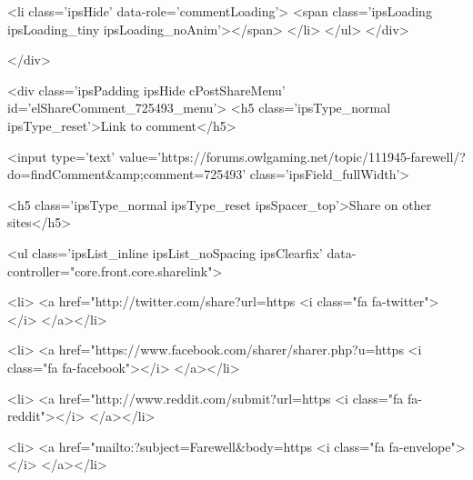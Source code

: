 						
						
					
					<li class='ipsHide' data-role='commentLoading'>
						<span class='ipsLoading ipsLoading_tiny ipsLoading_noAnim'></span>
					</li>
				</ul>
			</div>
		

		
			

		
	</div>

	

	



<div class='ipsPadding ipsHide cPostShareMenu' id='elShareComment_725493_menu'>
	<h5 class='ipsType_normal ipsType_reset'>Link to comment</h5>
	
		
	
	
	<input type='text' value='https://forums.owlgaming.net/topic/111945-farewell/?do=findComment&amp;comment=725493' class='ipsField_fullWidth'>

	
	<h5 class='ipsType_normal ipsType_reset ipsSpacer_top'>Share on other sites</h5>
	

	<ul class='ipsList_inline ipsList_noSpacing ipsClearfix' data-controller="core.front.core.sharelink">
		
			<li>
<a href="http://twitter.com/share?url=https%
	<i class="fa fa-twitter"></i>
</a></li>
		
			<li>
<a href="https://www.facebook.com/sharer/sharer.php?u=https%
	<i class="fa fa-facebook"></i>
</a></li>
		
			<li>
<a href="http://www.reddit.com/submit?url=https%
	<i class="fa fa-reddit"></i>
</a></li>
		
			<li>
<a href="mailto:?subject=Farewell&body=https%
	<i class="fa fa-envelope"></i>
</a></li>
		
